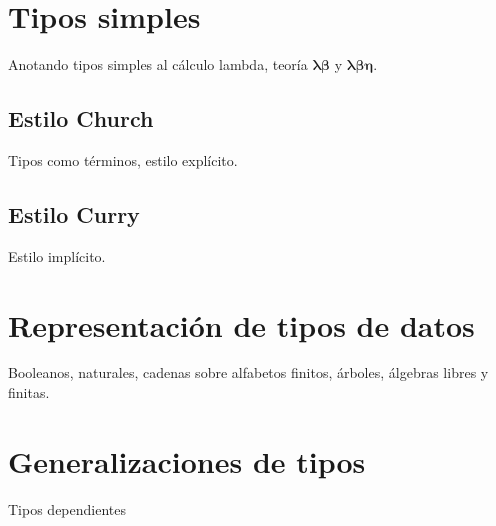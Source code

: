 \section{Tipos simples}

Anotando tipos simples al cálculo lambda, teoría \(\boldsymbol{\lambda \beta}\)
y \(\boldsymbol{\lambda \beta \eta}\).

\subsection{Estilo Church}

Tipos como términos, estilo explícito.

\subsection{Estilo Curry}

Estilo implícito.

\section{Representación de tipos de datos}

Booleanos, naturales, cadenas sobre alfabetos finitos, árboles, álgebras libres
y finitas.

\section{Generalizaciones de tipos}

Tipos dependientes

